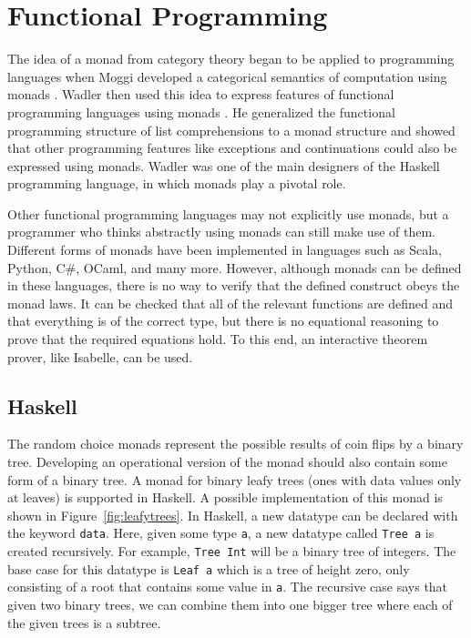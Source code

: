 \section{Functional Programming}

The idea of a monad from category theory began to be applied to programming languages when Moggi developed a categorical semantics of computation using monads \cite{moggi1988computational}.  Wadler then used this idea to express features of functional programming languages using monads \cite{wadler1992essence}.  He generalized the functional programming structure of list comprehensions to a monad structure and showed that other programming features like exceptions and continuations could also be expressed using monads.  Wadler was one of the main designers of the Haskell programming language, in which monads play a pivotal role.

Other functional programming languages may not explicitly use monads, but a programmer who thinks abstractly using monads can still make use of them.  Different forms of monads have been implemented in languages such as Scala, Python, C\#, OCaml, and many more.  However, although monads can be defined in these languages, there is no way to verify that the defined construct obeys the monad laws.  It can be checked that all of the relevant functions are defined and that everything is of the correct type, but there is no equational reasoning to prove that the required equations hold.  To this end, an interactive theorem prover, like Isabelle, can be used.

\subsection{Haskell}

The random choice monads represent the possible results of coin flips by a binary tree.  Developing an operational version of the monad should also contain some form of a binary tree.  A monad for binary leafy trees (ones with data values only at leaves) is supported in Haskell.  A possible implementation of this monad is shown in Figure~\ref{fig:leafytrees}.  In Haskell, a new datatype can be declared with the keyword \texttt{data}.  Here, given some type \texttt{a},  a new datatype called \texttt{Tree a} is created recursively.  For example, \texttt{Tree Int} will be a binary tree of integers.  The base case for this datatype is \texttt{Leaf a} which is a tree of height zero, only consisting of a root that contains some value in \texttt{a}.  The recursive case says that given two binary trees, we can combine them into one bigger tree where each of the given trees is a subtree.

